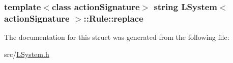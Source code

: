 \subsubsection[{\texorpdfstring{replace}{replace}}]{\setlength{\rightskip}{0pt plus 5cm}template$<$class action\+Signature$>$ string {\bf L\+System}$<$ action\+Signature $>$\+::Rule\+::replace}\hypertarget{struct_l_system_1_1_rule_a3b76bab5ac7d5db02bc8353dcb89027b}{}\label{struct_l_system_1_1_rule_a3b76bab5ac7d5db02bc8353dcb89027b}


The documentation for this struct was generated from the following file\+:\begin{DoxyCompactItemize}
\item 
src/\hyperlink{_l_system_8h}{L\+System.\+h}\end{DoxyCompactItemize}
